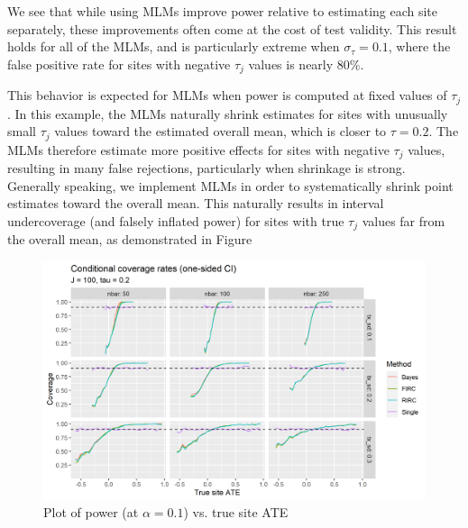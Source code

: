 \documentclass[]{article}
\begin{document}
We see that while using MLMs improve power relative to estimating each site separately, these improvements often come at the cost of test validity.
This result holds for all of the MLMs, and is particularly extreme when $\sigma_\tau = 0.1$, where the false positive rate for sites with negative $\tau_j$ values is nearly 80\%.

This behavior is expected for MLMs when power is computed at fixed values of $\tau_j$.
In this example, the MLMs naturally shrink estimates for sites with unusually small $\tau_j$ values toward the estimated overall mean, which is closer to $\tau = 0.2$.
The MLMs therefore estimate more positive effects for sites with negative $\tau_j$ values, resulting in many false rejections, particularly when shrinkage is strong.
Generally speaking, we implement MLMs in order to systematically shrink point estimates toward the overall mean.
This naturally results in interval undercoverage (and falsely inflated power) for sites with true $\tau_j$ values far from the overall mean, as demonstrated in Figure

\begin{figure}[ht]
	\centering
	\includegraphics[width=\textwidth]{writeup/images/coverage_plot.png}
	\caption{Plot of power (at $\alpha = 0.1$) vs. true site ATE}
	\label{fig:power_plot}
\end{figure}
\end{document}
